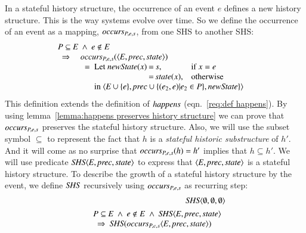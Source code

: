 \documentclass{elsarticle}
\def\id#1{\text{\em #1\/}}
\def\Events{{\mathit E}}
\begin{document}
	In a stateful history structure, the occurrence of an event $e$ defines a new history structure.
	This is the way systems evolve over time.
	So we define the occurrence of an event as a mapping, $\id{occurs}_{P,e,s}$, from one SHS to another SHS:
\begin{equation}
\begin{array}{l}
	P\subseteq\Events\ \wedge\ e\notin E\\
	\ \ \Rightarrow\ \ 
\begin{array}[t]{l}
	\id{occurs}_{P,e,s}(\la\Events, \id{prec}, \id{state}\ra)\\
	\ \ =\ \begin{array}[t]{@{}l@{\hspace{.2em}}c@{\hspace{.2em}}ll}
		\text{Let }\id{newState}(x)&=&s\text{,}&\text{if }x=e\\
				&=&\id{state}(x)\text{,}&\text{otherwise}\\
		\multicolumn{4}{@{}l}{\text{in }\la\Events\cup\{e\}, \id{prec}\cup\{(e_2,e)|e_2\in P\}, \id{newState}\}\ra}
		\end{array}
\end{array}
\end{array}
\label{req:def occurs}
\end{equation}
	This definition extends the definition of $\id{happens}$ (eqn.~\ref{req:def happens}).
	By using lemma~\ref{lemma:happens preserves history structure} we can prove that $\id{occurs}_{P,e,s}$ preserves
	the stateful history structure.
	Also, we will use the subset symbol $\subseteq$ to represent the fact that $h$ is a {\em stateful historic substructure} of $h'$.
	And it will come as no surprise that $\id{occurs}_{P,e,s}(h)=h'$ implies that $h\subseteq h'$.
	We will use predicate $\id{SHS}\la \Events, \id{prec}, \id{state}\ra$
	to express that $\la \Events, \id{prec}, \id{state}\ra$ is a stateful history structure.
	To describe the growth of a stateful history structure by the event,
	we define $\id{SHS}$ recursively using $\id{occurs}_{P,e,s}$ as recurring step:
\begin{eqnarray}
	&&\id{SHS}\la \emptyset, \emptyset, \emptyset\ra\\
&&\begin{array}{@{}l}
	P\subseteq\Events\ \wedge\ e\notin E\ \wedge\ \id{SHS}\la \Events, \id{prec}, \id{state}\ra\\
	\ \ \Rightarrow\ \id{SHS}(\id{occurs}_{P,e,s}\la \Events, \id{prec}, \id{state}\ra)
\end{array}
\label{req:recursive def occurs}
\end{eqnarray}
\end{document}
